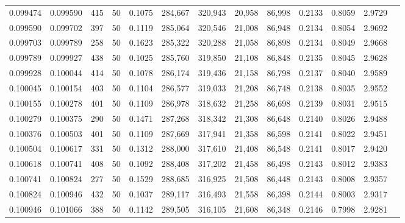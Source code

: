 \begin{tabular}{rrrrrrrrrrrrr}
0.099474 & 0.099590 &   415 &  50 &                                     0.1075 & 284,667 & 320,943 &  20,958 &  86,998 & 0.2133 & 0.8059 & 2.9729 \\
0.099590 & 0.099702 &   397 &  50 &                                     0.1119 & 285,064 & 320,546 &  21,008 &  86,948 & 0.2134 & 0.8054 & 2.9692 \\
0.099703 & 0.099789 &   258 &  50 &                                     0.1623 & 285,322 & 320,288 &  21,058 &  86,898 & 0.2134 & 0.8049 & 2.9668 \\
0.099789 & 0.099927 &   438 &  50 &                                     0.1025 & 285,760 & 319,850 &  21,108 &  86,848 & 0.2135 & 0.8045 & 2.9628 \\
0.099928 & 0.100044 &   414 &  50 &                                     0.1078 & 286,174 & 319,436 &  21,158 &  86,798 & 0.2137 & 0.8040 & 2.9589 \\
0.100045 & 0.100154 &   403 &  50 &                                     0.1104 & 286,577 & 319,033 &  21,208 &  86,748 & 0.2138 & 0.8035 & 2.9552 \\
0.100155 & 0.100278 &   401 &  50 &                                     0.1109 & 286,978 & 318,632 &  21,258 &  86,698 & 0.2139 & 0.8031 & 2.9515 \\
0.100279 & 0.100375 &   290 &  50 &                                     0.1471 & 287,268 & 318,342 &  21,308 &  86,648 & 0.2140 & 0.8026 & 2.9488 \\
0.100376 & 0.100503 &   401 &  50 &                                     0.1109 & 287,669 & 317,941 &  21,358 &  86,598 & 0.2141 & 0.8022 & 2.9451 \\
0.100504 & 0.100617 &   331 &  50 &                                     0.1312 & 288,000 & 317,610 &  21,408 &  86,548 & 0.2141 & 0.8017 & 2.9420 \\
0.100618 & 0.100741 &   408 &  50 &                                     0.1092 & 288,408 & 317,202 &  21,458 &  86,498 & 0.2143 & 0.8012 & 2.9383 \\
0.100741 & 0.100824 &   277 &  50 &                                     0.1529 & 288,685 & 316,925 &  21,508 &  86,448 & 0.2143 & 0.8008 & 2.9357 \\
0.100824 & 0.100946 &   432 &  50 &                                     0.1037 & 289,117 & 316,493 &  21,558 &  86,398 & 0.2144 & 0.8003 & 2.9317 \\
0.100946 & 0.101066 &   388 &  50 &                                     0.1142 & 289,505 & 316,105 &  21,608 &  86,348 & 0.2146 & 0.7998 & 2.9281 \\

\end{tabular}
